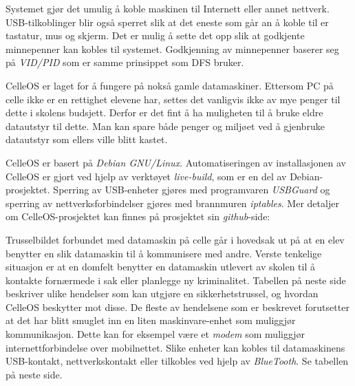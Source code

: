 Systemet gj\o r det umulig \aa{} koble maskinen til Internett eller annet nettverk. USB-tilkoblinger blir ogs\aa{} sperret slik at det eneste som g\aa r an \aa{} koble til er tastatur, mus og skjerm. Det er mulig \aa{} sette det opp slik at godkjente minnepenner kan kobles til systemet. Godkjenning av minnepenner baserer seg p\aa{} {\it VID/PID} som er samme prinsippet som DFS bruker.

CelleOS er laget for \aa{} fungere p\aa{} noks\aa{} gamle datamaskiner. Ettersom PC p\aa{} celle ikke er en rettighet elevene har, settes det vanligvis ikke av mye penger til dette i skolens budsjett. Derfor er det fint \aa{} ha muligheten til \aa{} bruke eldre datautstyr til dette. Man kan spare b\aa de penger og milj\o et ved \aa{} gjenbruke datautstyr som ellers ville blitt kastet.


CelleOS er basert p\aa{} {\it Debian GNU/Linux}. Automatiseringen av installasjonen av CelleOS er gjort ved hjelp av verkt\o yet {\it live-build}, som er en del av Debian-prosjektet. Sperring av USB-enheter gj\o res med programvaren {\it USBGuard} og sperring av nettverksforbindelser gj\o res med brannmuren {\it iptables}. Mer detaljer om CelleOS-prosjektet kan finnes p\aa{} prosjektet sin {\it github}-side:
\smallskip
{}


Trusselbildet forbundet med datamaskin p\aa{} celle g\aa r i hovedsak ut p\aa{} at en elev benytter en slik datamaskin til \aa{} kommunisere med andre. Verste tenkelige situasjon er at en domfelt benytter en datamaskin utlevert av skolen til \aa{} kontakte forn\ae rmede i sak eller planlegge ny kriminalitet.
Tabellen p\aa{} neste side beskriver ulike hendelser som kan utgj\o re en sikkerhetstrussel, og hvordan CelleOS beskytter mot disse. De fleste av hendelsene som er beskrevet forutsetter at det har blitt smuglet inn en liten maskinvare-enhet som muliggj\o r kommunikasjon. Dette kan for eksempel v\ae re et {\it modem} som muliggj\o r internettforbindelse over mobilnettet. Slike enheter kan kobles til datamaskinens USB-kontakt, nettverkskontakt eller tilkobles ved hjelp av {\it BlueTooth}. Se tabellen p\aa{} neste side.

\vfill\eject
\topglue 1pc

\def\firstcolwidth{12pc}
\def\secondcolwidth{19pc}
\def\tablerow#1#2{
\vbox{
\btexdraw
\drawdim pc
\textref h:L v:T
\move(0 0) \htext{\vbox{\hsize=\firstcolwidth \noindent\raggedright #1}}
\move(16 0) \htext{\vbox{\hsize=\secondcolwidth \noindent\raggedright #2}}
\etexdraw
}}
\def\tablehline{
\vbox{
\btexdraw
\drawdim pc
\move(0 0) \linewd 0.01 \lvec(35 0)
\etexdraw}
}

